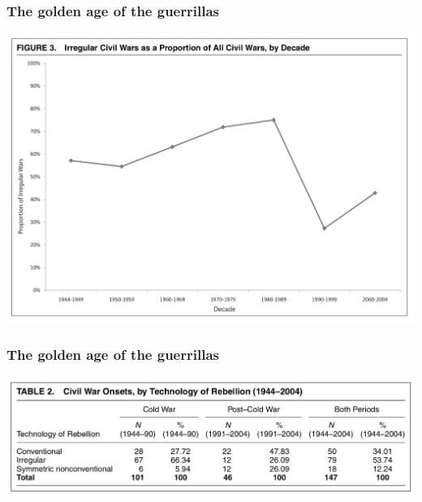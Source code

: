 \documentclass[utf8, xcolor=dvipsnames]{beamer}
\begin{document}
\begin{frame}
\frametitle{The golden age of the guerrillas}
\centering

\includegraphics[width = \textwidth]{img/kalyvas_balcells_irr}

\end{frame}

\begin{frame}
\frametitle{The golden age of the guerrillas}
\centering

\includegraphics[width = \textwidth]{img/kalyvas_balcells_table}

\end{frame}
\end{document}
